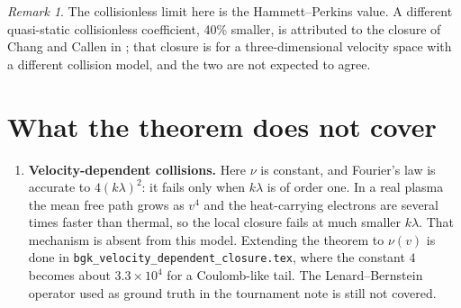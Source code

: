 \documentclass[11pt]{article}
\theoremstyle{remark}
\newtheorem{remark}[theorem]{Remark}
\begin{document}
\begin{remark}
The collisionless limit here is the Hammett--Perkins value. A different
quasi-static collisionless coefficient, 40\% smaller, is attributed to the
closure of Chang and Callen in \cite{Brodrick}; that closure is for a
three-dimensional velocity space with a different collision model, and the
two are not expected to agree.
\end{remark}

\section{What the theorem does not cover}
\label{sec:limits}

\begin{enumerate}
  \item \textbf{Velocity-dependent collisions.} Here $\nu$ is constant, and
    Fourier's law is accurate to $4(k\lambda)^2$: it fails only when
    $k\lambda$ is of order one. In a real plasma the mean free path grows as
    $v^4$ and the heat-carrying electrons are several times faster than
    thermal, so the local closure fails at much smaller $k\lambda$. That
    mechanism is absent from this model. Extending the theorem to
    $\nu(v)$ is done in \texttt{bgk\_velocity\_dependent\_closure.tex},
    where the constant $4$ becomes about $3.3\times10^4$ for a Coulomb-like
    tail. The Lenard--Bernstein operator used as ground truth in the
    tournament note is still not covered.


\end{enumerate}
\end{document}
